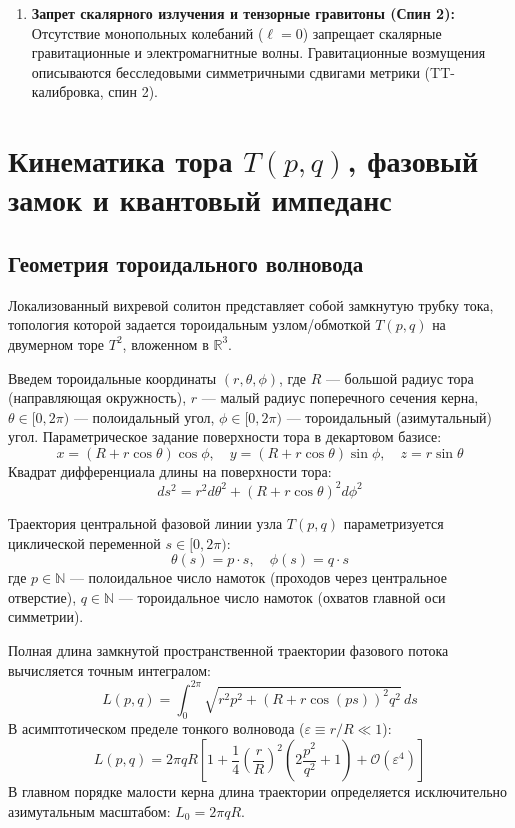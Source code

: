 \documentclass[12pt,a4paper]{article}
\begin{document}
\begin{enumerate}
		\item \textbf{Запрет скалярного излучения и тензорные гравитоны (Спин 2):}
		Отсутствие монопольных колебаний ($\ell = 0$) запрещает скалярные гравитационные и электромагнитные волны. Гравитационные возмущения описываются бесследовыми симметричными сдвигами метрики (TT-калибровка, спин 2).
	\end{enumerate}
	
	\section{Кинематика тора $T(p,q)$, фазовый замок и квантовый импеданс}
	
	\subsection{Геометрия тороидального волновода}
	Локализованный вихревой солитон представляет собой замкнутую трубку тока, топология которой задается тороидальным узлом/обмоткой $T(p,q)$ на двумерном торе $T^2$, вложенном в $\mathbb{R}^3$.
	
	Введем тороидальные координаты $(r, \theta, \phi)$, где $R$ — большой радиус тора (направляющая окружность), $r$ — малый радиус поперечного сечения керна, $\theta \in [0, 2\pi)$ — полоидальный угол, $\phi \in [0, 2\pi)$ — тороидальный (азимутальный) угол. Параметрическое задание поверхности тора в декартовом базисе:
	\begin{equation}
		x = (R + r \cos\theta) \cos\phi, \quad y = (R + r \cos\theta) \sin\phi, \quad z = r \sin\theta
	\end{equation}
	Квадрат дифференциала длины на поверхности тора:
	\begin{equation}
		ds^2 = r^2 d\theta^2 + (R + r \cos\theta)^2 d\phi^2
	\end{equation}
	
	Траектория центральной фазовой линии узла $T(p,q)$ параметризуется циклической переменной $s \in [0, 2\pi)$:
	\begin{equation}
		\theta(s) = p \cdot s, \quad \phi(s) = q \cdot s
	\end{equation}
	где $p \in \mathbb{N}$ — полоидальное число намоток (проходов через центральное отверстие), $q \in \mathbb{N}$ — тороидальное число намоток (охватов главной оси симметрии).
	
	Полная длина замкнутой пространственной траектории фазового потока вычисляется точным интегралом:
	\begin{equation}
		L(p,q) = \int_0^{2\pi} \sqrt{r^2 p^2 + (R + r \cos(ps))^2 q^2} \, ds
	\end{equation}
	В асимптотическом пределе тонкого волновода ($\varepsilon \equiv r/R \ll 1$):
	\begin{equation}
		L(p,q) = 2\pi q R \left[ 1 + \frac{1}{4} \left(\frac{r}{R}\right)^2 \left( 2\frac{p^2}{q^2} + 1 \right) + \mathcal{O}(\varepsilon^4) \right]
	\end{equation}
	В главном порядке малости керна длина траектории определяется исключительно азимутальным масштабом: $L_0 = 2\pi q R$.
	
\end{document}
